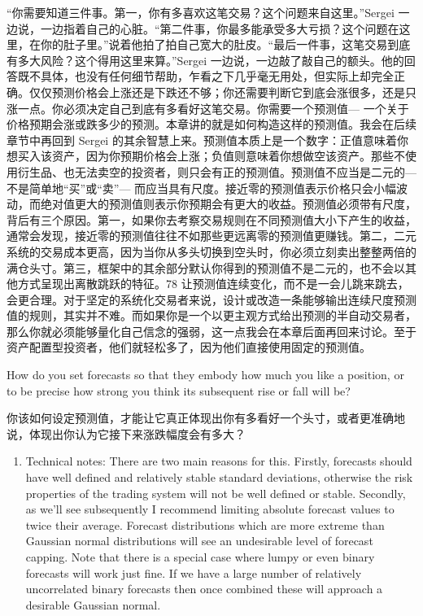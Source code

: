 \begin{chineseblock}“你需要知道三件事。第一，你有多喜欢这笔交易？这个问题来自这里。”Sergei 一边说，一边指着自己的心脏。“第二件事，你最多能承受多大亏损？这个问题在这里，在你的肚子里。”说着他拍了拍自己宽大的肚皮。“最后一件事，这笔交易到底有多大风险？这个得用这里来算。”Sergei 一边说，一边敲了敲自己的额头。他的回答既不具体，也没有任何细节帮助，乍看之下几乎毫无用处，但实际上却完全正确。仅仅预测价格会上涨还是下跌还不够；你还需要判断它到底会涨很多，还是只涨一点。你必须决定自己到底有多看好这笔交易。你需要一个预测值--- 一个关于价格预期会涨或跌多少的预测。本章讲的就是如何构造这样的预测值。我会在后续章节中再回到 Sergei 的其余智慧上来。预测值本质上是一个数字：正值意味着你想买入该资产，因为你预期价格会上涨；负值则意味着你想做空该资产。那些不使用衍生品、也无法卖空的投资者，则只会有正的预测值。预测值不应当是二元的--- 不是简单地“买”或“卖”--- 而应当具有尺度。接近零的预测值表示价格只会小幅波动，而绝对值更大的预测值则表示你预期会有更大的收益。预测值必须带有尺度，背后有三个原因。第一，如果你去考察交易规则在不同预测值大小下产生的收益，通常会发现，接近零的预测值往往不如那些更远离零的预测值更赚钱。第二，二元系统的交易成本更高，因为当你从多头切换到空头时，你必须立刻卖出整整两倍的满仓头寸。第三，框架中的其余部分默认你得到的预测值不是二元的，也不会以其他方式呈现出离散跳跃的特征。78 让预测值连续变化，而不是一会儿跳来跳去，会更合理。对于坚定的系统化交易者来说，设计或改造一条能够输出连续尺度预测值的规则，其实并不难。而如果你是一个以更主观方式给出预测的半自动交易者，那么你就必须能够量化自己信念的强弱，这一点我会在本章后面再回来讨论。至于资产配置型投资者，他们就轻松多了，因为他们直接使用固定的预测值。\end{chineseblock}


\begin{englishblock} How do you set forecasts so that they embody how much you like a position, or to be precise how strong you think its subsequent rise or fall will be? \end{englishblock}

\begin{chineseblock}你该如何设定预测值，才能让它真正体现出你有多看好一个头寸，或者更准确地说，体现出你认为它接下来涨跌幅度会有多大？\end{chineseblock}

\begin{enumerate}
\item Technical notes: There are two main reasons for this. Firstly, forecasts should have well defined and relatively stable standard deviations, otherwise the risk properties of the trading system will not be well defined or stable. Secondly, as we'll see subsequently I recommend limiting absolute forecast values to twice their average. Forecast distributions which are more extreme than Gaussian normal distributions will see an undesirable level of forecast capping. Note that there is a special case where lumpy or even binary forecasts will work just fine. If we have a large number of relatively uncorrelated binary forecasts then once combined these will approach a desirable Gaussian normal. \end{enumerate}

